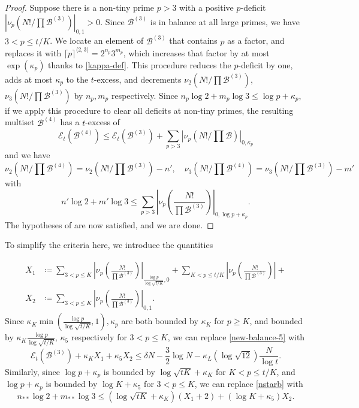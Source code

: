 \documentclass[12pt,a4paper,reqno]{amsart}
\numberwithin{equation}{section}
\theoremstyle{plain}
\theoremstyle{definition}
\newcommand\tuple{{\mathcal B}}
\newcommand\excess{{\mathcal{E}}}
\begin{document}
\begin{proof} Suppose there is a non-tiny prime $p>3$ with a positive $p$-deficit
$|\nu_p(N!/\prod \tuple^{(3)})|_{0,1} > 0$.  Since $\tuple^{(3)}$ is in balance at all large primes, we have $3 < p \leq t/K$.  We locate an element of $\tuple^{(3)}$ that contains $p$ as a factor, and replaces it with $\lceil p \rceil^{\langle 2,3 \rangle} = 2^{n_p} 3^{m_p}$, which increases that factor by at most $\exp(\kappa_{p})$ thanks to \eqref{kappa-def}.  This procedure reduces the $p$-deficit by one, adds at most $\kappa_{p}$ to the $t$-excess, and decrements $\nu_2(N!/\prod \tuple^{(3)})$, $\nu_3(N!/\prod \tuple^{(3)})$ by $n_{p}, m_{p}$ respectively.  Since $n_{p} \log 2 + m_{p} \log 3 \leq \log p + \kappa_{p}$, if we apply this procedure to clear all deficits at non-tiny primes, the resulting multiset $\tuple^{(4)}$ has a $t$-excess of
$$ \excess_t(\tuple^{(4)}) \leq \excess_t(\tuple^{(3)})  + \sum_{p > 3} |\nu_p(N!/\prod \tuple)|_{0,\kappa_p}$$
and we have
$$ \nu_2(N!/\prod \tuple^{(4)}) = \nu_2(N!/\prod \tuple^{(3)}) - n', \quad \nu_3(N!/\prod \tuple^{(4)}) = \nu_3(N!/
\prod \tuple^{(3)}) - m'$$
with
$$n' \log 2 + m' \log 3 \leq \sum_{p>3} \left|\nu_p\left(\frac{N!}{\prod \tuple^{(3)}}\right)\right|_{0, \log p+\kappa_{p}}.$$  
The hypotheses of  are now satisfied, and we are done.
\end{proof}

To simplify the criteria here, we introduce the quantities

\begin{align}
X_1 &\coloneqq \sum_{3 < p \leq K} \left|\nu_p\left(\frac{N!}{\prod \tuple^{(3)}}\right)\right|_{\frac{\log p}{\log\sqrt{t/K}},0} + \sum_{K < p \leq t/K} \left|\nu_p\left(\frac{N!}{\prod \tuple^{(3)}}\right)\right| +  \label{x1-def}\\
X_2 &\coloneqq \sum_{3 < p \leq K} \left|\nu_p\left(\frac{N!}{\prod \tuple^{(3)}}\right)\right|_{0,1}.\label{x2-def}
\end{align}
Since $\kappa_K \min(\frac{\log p}{\log\sqrt{t/K}},1),\kappa_p$ are both bounded by $\kappa_K$ for $p \geq K$, and bounded by $\kappa_K \frac{\log p}{\log\sqrt{t/K}}$, $\kappa_5$ respectively for $3 < p \leq K$, we can replace \eqref{new-balance-5} with 
\begin{equation}\label{new-balance-6}
      \excess_t(\tuple^{(3)}) + \kappa_K X_1 + \kappa_5 X_2 \leq \delta N - \frac{3}{2} \log N - \kappa_L (\log \sqrt{12}) \frac{N}{\log t}.
\end{equation}
Similarly, since $\log p + \kappa_p$ is bounded by $\log\sqrt{tK} + \kappa_K$ for $K < p \leq t/K$, and $\log p + \kappa_p$ is bounded by $\log K + \kappa_5$ for $3 < p \leq K$, we can replace \eqref{nstarb} with
\begin{equation}\label{nstarb-2}
 n_{**} \log 2 + m_{**} \log 3 \leq
 (\log\sqrt{tK} + \kappa_K) (X_1+2) + (\log K+\kappa_5) X_2.
\end{equation}
\end{document}
